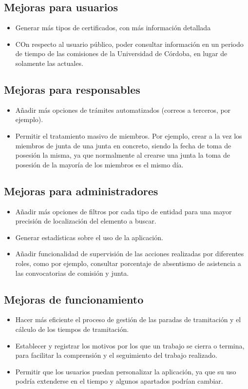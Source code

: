 \subsection{Mejoras para usuarios}
\begin{itemize}
    \item Generar más tipos de certificados, con más información detallada
    \item COn respecto al usuario público, poder consultar información en un periodo de tiempo de las comisiones de la Universidad de Córdoba, en lugar de solamente las actuales.
\end{itemize}

\subsection{Mejoras para responsables}
\begin{itemize}
    \item Añadir más opciones de trámites automatizados (correos a terceros, por ejemplo).
    \item Permitir el tratamiento masivo de miembros. Por ejemplo, crear a la vez los miembros de junta de una junta en concreto, siendo la fecha de toma de posesión la misma, ya que normalmente al crearse una junta la toma de posesión de la mayoría de los miembros es el mismo día.
\end{itemize}

\subsection{Mejoras para administradores}
\begin{itemize}
    \item Añadir más opciones de filtros por cada tipo de entidad para una mayor precisión de localización del elemento a buscar.
    \item Generar estadísticas sobre el uso de la aplicación.
    \item Añadir funcionalidad de supervisión de las acciones realizadas por diferentes roles, como por ejemplo, consultar porcentaje de absentismo de asistencia a las convocatorias de comisión y junta.
\end{itemize}

\subsection{Mejoras de funcionamiento}
\begin{itemize}
    \item Hacer más eficiente el proceso de gestión de las paradas de tramitación y el cálculo de los tiempos de tramitación.
    \item Establecer y registrar los motivos por los que un trabajo se cierra o termina, para facilitar la comprensión y el seguimiento del trabajo realizado.
    \item Permitir que los usuarios puedan personalizar la aplicación, ya que su uso podría extenderse en el tiempo y algunos apartados podrían cambiar.
\end{itemize}

